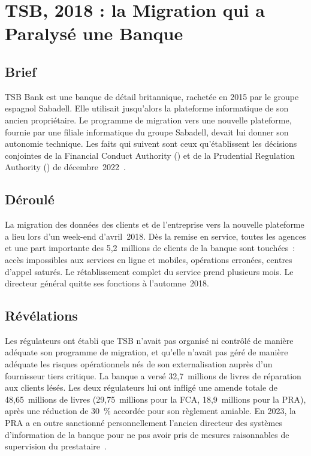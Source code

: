 \section{TSB, 2018 : la Migration qui a Paralysé une Banque}
\label{sec:c02-tsb}

\subsection{Brief}

TSB Bank est une banque de détail britannique, rachetée en 2015 par le
groupe espagnol Sabadell. Elle utilisait jusqu'alors la plateforme
informatique de son ancien propriétaire. Le programme de migration vers
une nouvelle plateforme, fournie par une filiale informatique du groupe
Sabadell, devait lui donner son autonomie technique. Les faits qui
suivent sont ceux qu'établissent les décisions conjointes de la Financial
Conduct Authority () et de la Prudential Regulation Authority
() de décembre~2022~\cite{fca2022tsb}.

\subsection{Déroulé}

La migration des données des clients et de l'entreprise vers la nouvelle
plateforme a lieu lors d'un week-end d'avril~2018. Dès la remise en
service, toutes les agences et une part importante des 5,2~millions de
clients de la banque sont touchées~: accès impossibles aux services en
ligne et mobiles, opérations erronées, centres d'appel saturés. Le
rétablissement complet du service prend plusieurs mois. Le directeur
général quitte ses fonctions à l'automne~2018.

\subsection{Révélations}

Les régulateurs ont établi que TSB n'avait pas organisé ni contrôlé de
manière adéquate son programme de migration, et qu'elle n'avait pas géré
de manière adéquate les risques opérationnels nés de son externalisation
auprès d'un fournisseur tiers critique. La banque a versé 32,7~millions de
livres de réparation aux clients lésés. Les deux régulateurs lui ont
infligé une amende totale de 48,65~millions de livres (29,75~millions pour
la FCA, 18,9~millions pour la PRA), après une réduction de 30~\% accordée
pour son règlement amiable. En 2023, la PRA a en outre sanctionné
personnellement l'ancien directeur des systèmes d'information de la banque
pour ne pas avoir pris de mesures raisonnables de supervision du
prestataire~\cite{pra2023abarca}.

